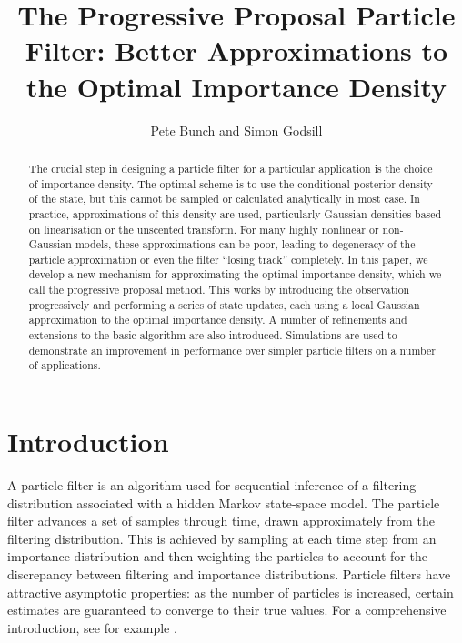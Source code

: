 \documentclass{article}
\title{The Progressive Proposal Particle Filter: Better Approximations to the Optimal Importance Density}
\author{Pete Bunch and Simon Godsill}
\date{}
\begin{document}
\maketitle

\begin{abstract}
The crucial step in designing a particle filter for a particular application is the choice of importance density. The optimal scheme is to use the conditional posterior density of the state, but this cannot be sampled or calculated analytically in most case. In practice, approximations of this density are used, particularly Gaussian densities based on linearisation or the unscented transform. For many highly nonlinear or non-Gaussian models, these approximations can be poor, leading to degeneracy of the particle approximation or even the filter ``losing track'' completely. In this paper, we develop a new mechanism for approximating the optimal importance density, which we call the progressive proposal method. This works by introducing the observation progressively and performing a series of state updates, each using a local Gaussian approximation to the optimal importance density. A number of refinements and extensions to the basic algorithm are also introduced. Simulations are used to demonstrate an improvement in performance over simpler particle filters on a number of applications.
\end{abstract}






\section{Introduction}

A particle filter is an algorithm used for sequential inference of a filtering distribution associated with a hidden Markov state-space model. The particle filter advances a set of samples through time, drawn approximately from the filtering distribution. This is achieved by sampling at each time step from an importance distribution and then weighting the particles to account for the discrepancy between filtering and importance distributions. Particle filters have attractive asymptotic properties: as the number of particles is increased, certain estimates are guaranteed to converge to their true values. For a comprehensive introduction, see for example \citep{Cappe2007,Doucet2009}.
\end{document}
